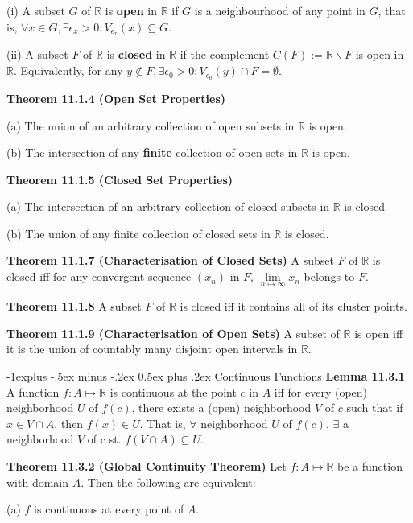 \documentclass[10pt,landscape]{article}
\makeatletter
\renewcommand{\subsection}{\@startsection{subsection}{2}{0mm}%
                                {-1explus -.5ex minus -.2ex}%
                                {0.5ex plus .2ex}%
                                {\normalfont\normalsize\bfseries}}
\makeatother
\begin{document}
\begin{multicols}{4}
(i) A subset $G$ of $\mathbb{R}$ is \textbf{open} in $\mathbb{R}$ if $G$ is a neighbourhood of any point in $G$, that is, $\forall x \in G, \exists \epsilon_x > 0: V_{\epsilon_x}(x) \subseteq G$.

(ii) A subset $F$ of $\mathbb{R}$ is \textbf{closed} in $\mathbb{R}$ if the complement $C(F) := \mathbb{R} \backslash F$ is open in $\mathbb{R}$. Equivalently, for any $y \notin F, \exists \epsilon_0 > 0: V_{\epsilon_0}(y) \cap F = \emptyset$.

\textbf{Theorem 11.1.4 (Open Set Properties)} 

(a) The union of an arbitrary collection of open subsets in $\mathbb{R}$ is open. 

(b) The intersection of any \textbf{finite} collection of open sets in $\mathbb{R}$ is open. 

\textbf{Theorem 11.1.5 (Closed Set Properties)} 

(a) The intersection of an arbitrary collection of closed subsets in $\mathbb{R}$ is closed

(b) The union of any finite collection of closed sets in $\mathbb{R}$ is closed.

\textbf{Theorem 11.1.7 (Characterisation of Closed Sets)} A subset $F$ of $\mathbb{R}$ is closed iff for any convergent sequence $(x_n)$ in $F$, $\underset{n \mapsto \infty}{\lim} x_n$ belongs to $F$.

\textbf{Theorem 11.1.8} A subset $F$ of $\mathbb{R}$ is closed iff it contains all of its cluster points.

\textbf{Theorem 11.1.9 (Characterisation of Open Sets)} A subset of $\mathbb{R}$ is open iff it is the union of countably many disjoint open intervals in $\mathbb{R}$.

\subsection{Continuous Functions}
\textbf{Lemma 11.3.1} A function $f: A \mapsto \mathbb{R}$ is continuous at the point $c$ in $A$ iff for every (open) neighborhood $U$ of $f(c)$, there exists a (open) neighborhood $V$ of $c$ such that if $x \in V \cap A$, then $f(x) \in U$. That is, $\forall$ neighborhood $U$ of $f(c)$, $\exists$ a neighborhood $V$ of c st. $f(V \cap A) \subseteq U$.

\textbf{Theorem 11.3.2 (Global Continuity Theorem)} Let $f: A \mapsto \mathbb{R}$ be a function with domain $A$. Then the following are equivalent:

(a) $f$ is continuous at every point of $A$.


\end{multicols}
\end{document}
